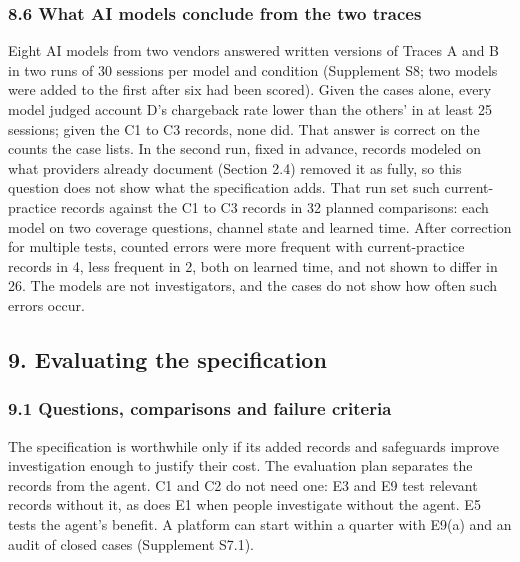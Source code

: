 \documentclass[
  11pt,
]{article}
\begin{document}
\hypertarget{what-ai-models-conclude-from-the-two-traces}{%
\subsubsection{8.6 What AI models conclude from the two
traces}\label{what-ai-models-conclude-from-the-two-traces}}

Eight AI models from two vendors answered written versions of Traces A
and B in two runs of 30 sessions per model and condition (Supplement S8;
two models were added to the first after six had been scored). Given the
cases alone, every model judged account D's chargeback rate lower than
the others' in at least 25 sessions; given the C1 to C3 records, none
did. That answer is correct on the counts the case lists. In the second
run, fixed in advance, records modeled on what providers already
document (Section 2.4) removed it as fully, so this question does not
show what the specification adds. That run set such current-practice
records against the C1 to C3 records in 32 planned comparisons: each
model on two coverage questions, channel state and learned time. After
correction for multiple tests, counted errors were more frequent with
current-practice records in 4, less frequent in 2, both on learned time,
and not shown to differ in 26. The models are not investigators, and the
cases do not show how often such errors occur.

\FloatBarrier

\hypertarget{evaluating-the-specification}{%
\subsection{9. Evaluating the
specification}\label{evaluating-the-specification}}

\suppressfloats[t]

\hypertarget{questions-comparisons-and-failure-criteria}{%
\subsubsection{9.1 Questions, comparisons and failure
criteria}\label{questions-comparisons-and-failure-criteria}}

The specification is worthwhile only if its added records and safeguards
improve investigation enough to justify their cost. The evaluation plan
separates the records from the agent. C1 and C2 do not need one: E3 and
E9 test relevant records without it, as does E1 when people investigate
without the agent. E5 tests the agent's benefit. A platform can start
within a quarter with E9(a) and an audit of closed cases (Supplement
S7.1).
\end{document}
